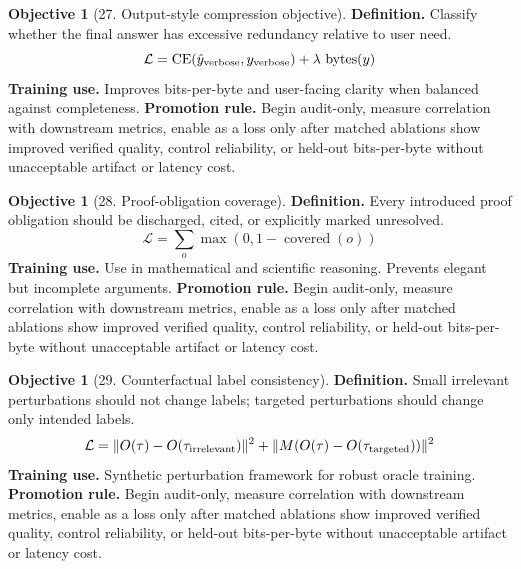 \documentclass[11pt]{article}
\theoremstyle{definition}
\newtheorem{objective}[theorem]{Objective}
\theoremstyle{remark}
\newcommand{\CE}{\operatorname{CE}}
\newcommand{\loss}{\mathcal{L}}
\numberwithin{equation}{section}
\begin{document}
\begin{objective}[27. Output-style compression objective]
\textbf{Definition.} Classify whether the final answer has excessive redundancy relative to user need.
\begin{equation}
    \loss=\CE(\hat y_{\rm verbose},y_{\rm verbose})+\lambda\,\operatorname{bytes}(y)
\end{equation}
\textbf{Training use.} Improves bits-per-byte and user-facing clarity when balanced against completeness.
\textbf{Promotion rule.} Begin audit-only, measure correlation with downstream metrics, enable as a loss only after matched ablations show improved verified quality, control reliability, or held-out bits-per-byte without unacceptable artifact or latency cost.
\end{objective}


\begin{objective}[28. Proof-obligation coverage]
\textbf{Definition.} Every introduced proof obligation should be discharged, cited, or explicitly marked unresolved.
\begin{equation}
    \loss=\sum_o\max(0,1-\operatorname{covered}(o))
\end{equation}
\textbf{Training use.} Use in mathematical and scientific reasoning. Prevents elegant but incomplete arguments.
\textbf{Promotion rule.} Begin audit-only, measure correlation with downstream metrics, enable as a loss only after matched ablations show improved verified quality, control reliability, or held-out bits-per-byte without unacceptable artifact or latency cost.
\end{objective}


\begin{objective}[29. Counterfactual label consistency]
\textbf{Definition.} Small irrelevant perturbations should not change labels; targeted perturbations should change only intended labels.
\begin{equation}
    \loss=\|O(\tau)-O(\tau_{\rm irrelevant})\|^2+\|M(O(\tau)-O(\tau_{\rm targeted}))\|^2
\end{equation}
\textbf{Training use.} Synthetic perturbation framework for robust oracle training.
\textbf{Promotion rule.} Begin audit-only, measure correlation with downstream metrics, enable as a loss only after matched ablations show improved verified quality, control reliability, or held-out bits-per-byte without unacceptable artifact or latency cost.
\end{objective}
\end{document}
